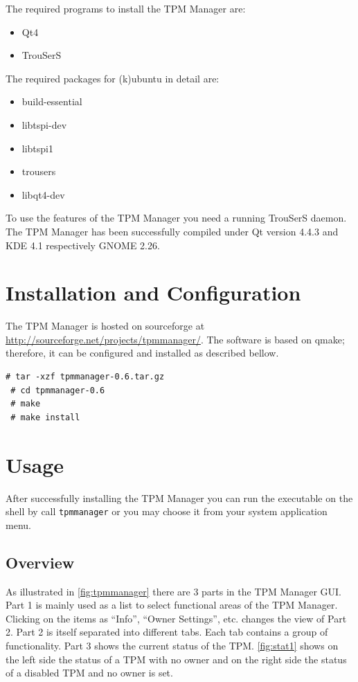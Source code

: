\documentclass[
  american        %
]{sirrixreport}
\begin{document}
The required programs to install the TPM Manager are: 
\begin{itemize}
   \item Qt4
   \item TrouSerS
\end{itemize}

The required packages for (k)ubuntu in detail are:
\begin{itemize}
   \item build-essential
   \item libtspi-dev
   \item libtspi1
   \item trousers
   \item libqt4-dev
\end{itemize}

To use the features of the TPM Manager you need a running TrouSerS daemon.
The TPM Manager has been successfully compiled under Qt version 4.4.3 and KDE 4.1 respectively GNOME 2.26.


\section{Installation and Configuration}
The TPM Manager is hosted on sourceforge at \url{http://sourceforge.net/projects/tpmmanager/}. The software is based on qmake; therefore, it can be configured and installed as described bellow.


 \begin{lstlisting}[caption=Configuring and compiling the TPM Manager:, frame=lines]
 # tar -xzf tpmmanager-0.6.tar.gz
 # cd tpmmanager-0.6
 # make
 # make install
 \end{lstlisting}  


\clearpage
\section{Usage}

After successfully installing the TPM Manager you can run the executable on the shell by call \texttt{tpmmanager} or you may choose it from your system application menu. 

\subsection{Overview}
As illustrated in \autoref{fig:tpmmanager} there are 3 parts in the TPM Manager GUI. 
Part 1 is mainly used as a list to select functional areas of the TPM Manager. Clicking on the items as ``Info'', ``Owner Settings'', etc. changes the view of Part 2. Part 2 is itself separated into different tabs. Each tab contains a group of functionality. Part 3 shows the current status of the TPM. \autoref{fig:stat1} shows on the left side the status of a TPM with no owner and on the right side the status of a disabled TPM and no owner is set.
\end{document}
